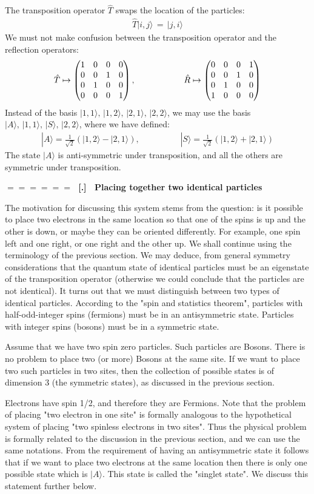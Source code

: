 \documentclass[onecolumn,fleqn]{revtex4}
\newcommand{\amatrix}[1]{\begin{matrix} #1 \end{matrix}}
\newcommand{\beq}{\begin{eqnarray}}
\newcommand{\eeq}{\end{eqnarray}}
\renewcommand{\thesubsection}{\arabic{subsection}}
\renewcommand{\thesubsubsection}{\arabic{subsubsection}}
\newcommand{\sheadC}[1]
{
\addtocounter{subsubsection}{1}
\vspace{5mm}
{\Large\bf $=\!=\!=\!=\!=\!=\;$ [\thesubsection.\thesubsubsection] \ #1}  
\nopagebreak
\phantomsection
}
\begin{document}
The transposition operator ${\hat{T}}$ swaps the location of the particles:
\beq
\hat{T}|i,j\rangle \, = \, |j,i\rangle
\eeq
We must not make confusion between 
the transposition operator and the reflection operators:
\beq
\hat{T} \mapsto 
\left(
\amatrix{1 & 0 & 0 & 0 \cr 0 & 0 & 1 & 0 \cr 0 & 1 & 0 & 0 \cr 0 & 0 & 0 & 1 } 
\right), 
\hspace{2cm} 
\hat{R} \mapsto 
\left(
\amatrix{0 & 0 & 0 & 1 \cr 0 & 0 & 1 & 0 \cr 0 & 1 & 0 & 0 \cr 1 & 0 & 0 & 0 }
\right) 
\eeq
Instead of the basis ${|1,1\rangle, \, |1,2\rangle, \, |2,1\rangle, \, |2,2\rangle}$, 
we may use the basis ${|A\rangle, \, |1,1\rangle, \, |S\rangle, \, |2,2\rangle}$, 
where we have defined:
\beq
|A\rangle=\frac{1}{\sqrt{2}}\left(|1,2\rangle-|2,1\rangle\right),
\hspace{2cm} 
|S\rangle=\frac{1}{\sqrt{2}}\left(|1,2\rangle+|2,1\rangle\right) 
\eeq
The state ${|A\rangle}$ is anti-symmetric under transposition, 
and all the others are symmetric under transposition. 



 
\sheadC{Placing together two identical particles}

The motivation for discussing this system stems from the 
question: is it possible to place two electrons in the 
same location so that one of the spins is up and the other 
is down, or maybe they can be oriented differently. 
For example, one spin left and one right, or one right 
and the other up. We shall continue using the 
terminology of the previous section. We may deduce, 
from general symmetry considerations that the quantum 
state of identical particles must be an eigenstate of 
the transposition operator (otherwise we could 
conclude that the particles are not identical). 
It turns out that we must distinguish between two 
types of identical particles. According to the "spin 
and statistics theorem", particles with half-odd-integer 
spins (fermions) must be in an antisymmetric state. 
Particles with integer spins (bosons) must be in a symmetric state.  

Assume that we have two spin zero particles. 
Such particles are Bosons. There is no problem 
to place two (or more) Bosons at the same site. 
If we want to place two such particles in two sites, 
then the collection of possible states is 
of dimension 3 (the symmetric states), as 
discussed in the previous section.


Electrons have spin 1/2, and therefore they are Fermions.
Note that the problem of placing "two electron in one site" 
is formally analogous to the hypothetical system 
of placing "two spinless electrons in two sites".   
Thus the physical problem is formally related to 
the discussion in the previous section, and we can 
use the same notations. From the requirement of 
having an antisymmetric state it follows that 
if we want to place two electrons at the same location 
then there is only one possible state which is ${|A\rangle}$. 
This state is called the "singlet state". 
We discuss this statement further below. 
\end{document}
